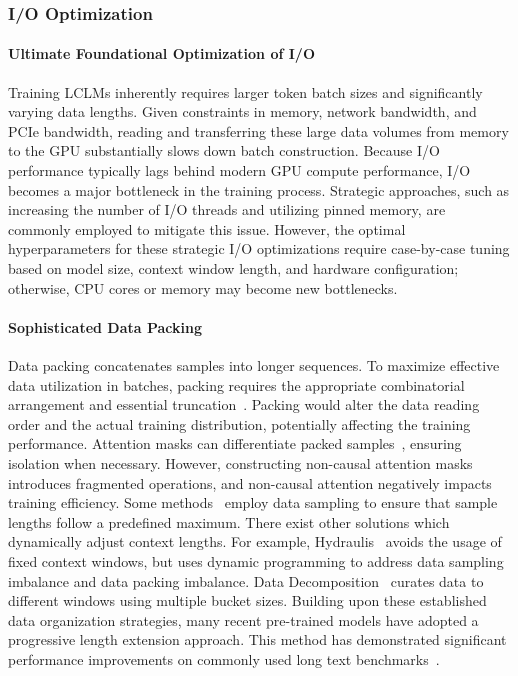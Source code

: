 \documentclass[11pt, a4paper, logo, copyright, nonumbering]{map}
\begin{document}
\subsubsection{I/O Optimization}

\paragraph{Ultimate Foundational Optimization of I/O}
Training LCLMs inherently requires larger token batch sizes and significantly varying data lengths. 
Given constraints in memory, network bandwidth, and PCIe bandwidth, reading and transferring these large data volumes from memory to the GPU substantially slows down batch construction. 
Because I/O performance typically lags behind modern GPU compute performance, I/O becomes a major bottleneck in the training process. 
Strategic approaches, such as increasing the number of I/O threads and utilizing pinned memory, are commonly employed to mitigate this issue. 
However, the optimal hyperparameters for these strategic I/O optimizations require case-by-case tuning based on model size, context window length, and hardware configuration; otherwise, CPU cores or memory may become new bottlenecks.


\paragraph{Sophisticated Data Packing} Data packing concatenates samples into longer sequences.
To maximize effective data utilization in batches, packing requires the appropriate combinatorial arrangement and essential truncation~\cite{staniszewski2023structured,lu2024datasculpt}.
Packing would alter the data reading order and the actual training distribution, potentially affecting the training performance. 
Attention masks can differentiate packed samples~\cite{kundu2024enhancing}, ensuring isolation when necessary.
However, constructing non-causal attention masks introduces fragmented operations, and non-causal attention negatively impacts training efficiency.
Some methods~\cite{bai2024longalign,krell2021efficient} employ data sampling to ensure that sample lengths follow a predefined maximum. 
There exist other solutions which dynamically adjust context lengths.
For example, Hydraulis~\cite{li2024demystifying} avoids the usage of fixed context windows, but uses dynamic programming to address data sampling imbalance and data packing imbalance.
Data Decomposition~\cite{pouransari2024dataset} curates data to different windows using multiple bucket sizes.
Building upon these established data organization strategies, many recent pre-trained models have adopted a progressive length extension approach. This method has demonstrated significant performance improvements on commonly used long text benchmarks~\cite{zhao2024longskywork,prolong,gao2024prolong,yang2025qwen2}.
\end{document}
